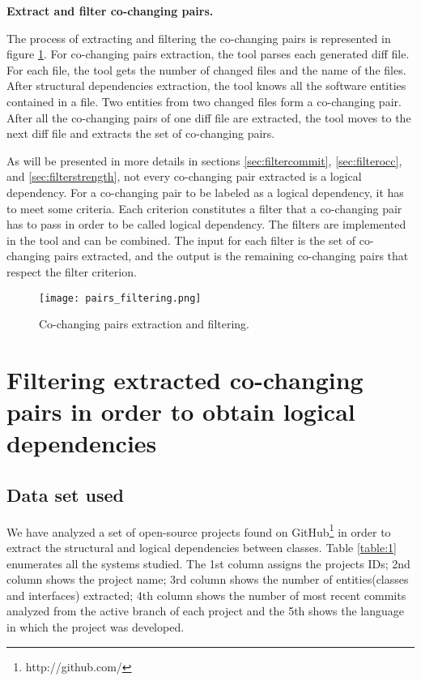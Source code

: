 \textbf{Extract and filter co-changing pairs.}

The process of extracting and filtering the co-changing pairs is represented in figure \ref{fig:figfiltering}.
For co-changing pairs extraction, the tool parses each generated diff file.
For each file, the tool gets the number of changed files and the name of the files. 
After structural dependencies extraction, the tool knows all the software entities contained in a file. Two entities from two changed files form a co-changing pair. After all the co-changing pairs of one diff file are extracted, the tool moves to the next diff file and extracts the set of co-changing pairs.

As will be presented in more details in sections \ref{sec:filtercommit}, \ref{sec:filterocc}, and \ref{sec:filterstrength}, not every co-changing pair extracted is a logical dependency. For a co-changing pair to be labeled as a logical dependency, it has to meet some criteria. Each criterion constitutes a filter that a co-changing pair has to pass in order to be called logical dependency.
The filters are implemented in the tool and can be combined. The input for each filter is the set of co-changing pairs extracted, and the output is the remaining co-changing pairs that respect the filter criterion.


\begin{figure}[H]
\centering
\texttt{[image: pairs\_filtering.png]}
\caption{Co-changing pairs extraction and filtering.}
\label{fig:figfiltering}
\end{figure}


\chapter {Filtering extracted co-changing pairs in order to obtain logical dependencies}

\section{Data set used}
\label{sec:dataset}
We have analyzed a set of open-source projects found on GitHub\footnote{http://github.com/} \cite{Kalliamvakou2016} in order to extract the structural and logical dependencies between classes. Table \ref{table:1} enumerates all the systems studied. The 1st column assigns the projects IDs; 2nd column shows the project name; 3rd column shows the number of entities(classes and interfaces) extracted; 4th column shows the number of most recent commits analyzed from the active branch of each project and the 5th shows the language in which the project was developed.


